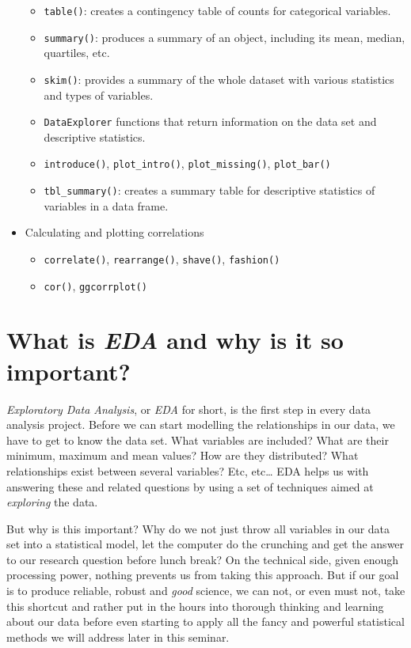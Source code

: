 \documentclass[
]{book}
\providecommand{\tightlist}{%
  \setlength{\itemsep}{0pt}\setlength{\parskip}{0pt}}
\begin{document}
\begin{itemize}
  \begin{itemize}
  \tightlist
  \item
    \texttt{table()}: creates a contingency table of counts for categorical variables.
  \item
    \texttt{summary()}: produces a summary of an object, including its mean, median, quartiles, etc.
  \item
    \texttt{skim()}: provides a summary of the whole dataset with various statistics and types of variables.
  \item
    \texttt{DataExplorer} functions that return information on the data set and descriptive statistics.
  \item
    \texttt{introduce()}, \texttt{plot\_intro()}, \texttt{plot\_missing()}, \texttt{plot\_bar()}
  \item
    \texttt{tbl\_summary()}: creates a summary table for descriptive statistics of variables in a data frame.
  \end{itemize}
\item
  Calculating and plotting correlations

  \begin{itemize}
  \tightlist
  \item
    \texttt{correlate()}, \texttt{rearrange()}, \texttt{shave()}, \texttt{fashion()}
  \item
    \texttt{cor()}, \texttt{ggcorrplot()}
  \end{itemize}
\end{itemize}

\hypertarget{what-is-eda-and-why-is-it-so-important}{%
\section{\texorpdfstring{What is \emph{EDA} and why is it so important?}{What is EDA and why is it so important?}}\label{what-is-eda-and-why-is-it-so-important}}

\emph{Exploratory Data Analysis}, or \emph{EDA} for short, is the first step in every data analysis project. Before we can start modelling the relationships in our data, we have to get to know the data set. What variables are included? What are their minimum, maximum and mean values? How are they distributed? What relationships exist between several variables? Etc, etc\ldots{} EDA helps us with answering these and related questions by using a set of techniques aimed at \emph{exploring} the data.

But why is this important? Why do we not just throw all variables in our data set into a statistical model, let the computer do the crunching and get the answer to our research question before lunch break? On the technical side, given enough processing power, nothing prevents us from taking this approach. But if our goal is to produce reliable, robust and \emph{good} science, we can not, or even must not, take this shortcut and rather put in the hours into thorough thinking and learning about our data before even starting to apply all the fancy and powerful statistical methods we will address later in this seminar.
\end{document}
